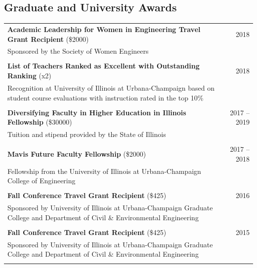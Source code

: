 \documentclass{article}[12pt]
\begin{document}
		\subsection*{Graduate and University Awards}
		
		\vspace{-1em}
		
		\begin{tabularx}{\textwidth}{Xr}
			
			\textbf{Academic Leadership for Women in Engineering Travel Grant Recipient} (\$\num{2000}) & 2018 \\
			Sponsored by the Society of Women Engineers \\
			\\
			\textbf{List of Teachers Ranked as Excellent with Outstanding Ranking} (x2) & 2018 \\
			Recognition at University of Illinois at Urbana-Champaign based on student course evaluations with instruction rated in the top 10\% \\
			\\
			\textbf{Diversifying Faculty in Higher Education in Illinois Fellowship} (\$\num{30000}) & 2017 -- 2019 \\
			Tuition and stipend provided by the State of Illinois & \\ 
			\\
			\textbf{Mavis  Future Faculty Fellowship} (\$\num{2000}) & 2017 -- 2018 \\
			Fellowship from the University of Illinois at Urbana-Champaign College of Engineering 
			\\
			\\
			\textbf{Fall Conference Travel Grant Recipient} (\$\num{425}) & 2016 \\
			Sponsored by University of Illinois at Urbana-Champaign Graduate College and Department of Civil \& Environmental Engineering\\
			\\
			\textbf{Fall Conference Travel Grant Recipient} (\$\num{425}) & 2015 \\
			Sponsored by University of Illinois at Urbana-Champaign Graduate College and Department of Civil \& Environmental Engineering\\
			\\

\end{tabularx}
\end{document}
